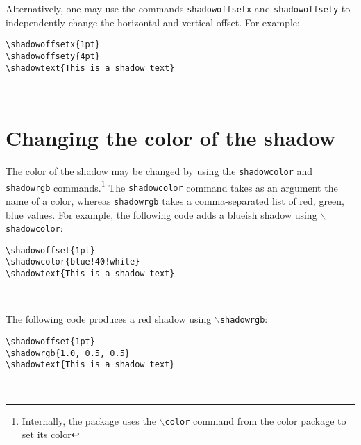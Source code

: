 \documentclass{article}
\begin{document}
Alternatively, one may use the commands {\tt shadowoffsetx} and {\tt shadowoffsety} to independently change
the horizontal and vertical offset. For example:

\begin{minipage}{\textwidth}
\begin{multicols*}{2} 
{\footnotesize
\begin{verbatim}
\shadowoffsetx{1pt}
\shadowoffsety{4pt}
\shadowtext{This is a shadow text}
\end{verbatim}}

\shadowoffsetx{1pt}
\shadowoffsety{4pt}
\\
\phantom{}
\end{multicols*}
\end{minipage}



\section{Changing the color of the shadow}
The color of the shadow may be changed by using the {\tt shadowcolor} and {\tt shadowrgb} commands.\footnote{Internally, the 
package uses the {\tt $\backslash$color} command from the color package to set its color} 
The {\tt shadowcolor} command takes as an argument the name of a color, whereas {\tt shadowrgb} takes a comma-separated list of red, green, blue
values. For example, the following code adds a blueish shadow using {\tt $\backslash$shadowcolor}:

\begin{minipage}{\textwidth}
\begin{multicols*}{2} 
{\footnotesize
\begin{verbatim}
\shadowoffset{1pt}
\shadowcolor{blue!40!white}
\shadowtext{This is a shadow text}
\end{verbatim}}

\shadowoffset{1pt}
\\
\phantom{}
\end{multicols*}
\end{minipage}

The following code produces a red shadow using {\tt $\backslash$shadowrgb}:

\begin{minipage}{\textwidth}
\begin{multicols*}{2} 
{\footnotesize
\begin{verbatim}
\shadowoffset{1pt}
\shadowrgb{1.0, 0.5, 0.5}
\shadowtext{This is a shadow text}
\end{verbatim}}

\shadowoffset{1pt}
\\
\phantom{}
\end{multicols*}
\end{minipage}
\end{document}
